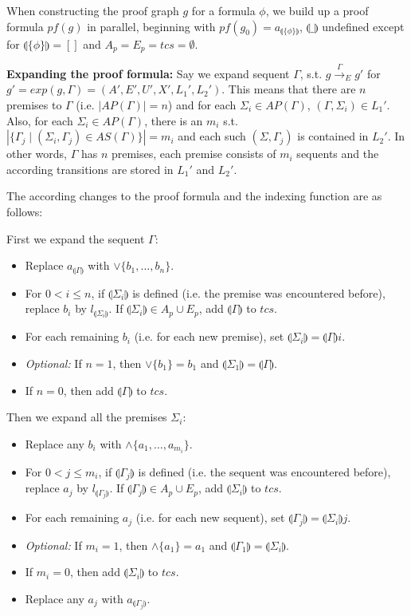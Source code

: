 \documentclass{llncs}
\newcommand{\ind}[1]{\llparenthesis #1 \rrparenthesis}
\begin{document}
When constructing the proof graph $g$ for a formula $\phi$, we build up a proof formula
$pf(g)$ in parallel, beginning with $pf(g_0)=a_{\ind{\{\phi\}}}$, $\ind{\_}$ undefined except
for $\ind{\{\phi\}}=[]$ and $A_p=E_p=tcs=\emptyset$.

\noindent\textbf{Expanding the proof formula:} 
Say we expand sequent $\Gamma$, s.t. $g\stackrel{\Gamma}\rightarrow_E g'$ for $g'=exp(g,\Gamma)=(A',E',U',X',L_1',L_2')$.
This means that there are $n$ premises to $\Gamma$ (i.e. $|AP(\Gamma)|=n$) and for each $\Sigma_i \in AP(\Gamma)$,
$(\Gamma,\Sigma_i)\in L_1'$. Also, for each $\Sigma_i \in AP(\Gamma)$, there is an $m_i$ s.t.
$|\{\Gamma_j\mid (\Sigma_i,\Gamma_j)\in AS(\Gamma)\}|=m_i$ and each such $(\Sigma,\Gamma_j)$ is contained in $L_2'$.
In other words, $\Gamma$ has $n$ premises, each premise consists of $m_i$ sequents and the according
transitions are stored in $L_1'$ and $L_2'$.

The according changes to the proof formula and the indexing function are as follows:

\noindent First we expand the sequent $\Gamma$:
\begin{itemize}
\item Replace $a_{\ind{\Gamma}}$ with $\vee\{b_1,\ldots,b_n\}$.
\item For $0<i\leq n$, if $\ind{\Sigma_i}$ is defined (i.e. the premise was encountered before),
replace $b_i$ by $l_{\ind{\Sigma_i}}$. If $\ind{\Sigma_i}\in A_p\cup E_p$, add $\ind{\Gamma}$ to $tcs$.
\item For each remaining $b_i$ (i.e. for each new premise), set $\ind{\Sigma_i}=\ind{\Gamma}i$.
\item \emph{Optional:} If $n=1$, then $\vee\{b_1\}=b_1$ and $\ind{\Sigma_1}=\ind{\Gamma}$.
\item If $n=0$, then add $\ind{\Gamma}$ to $tcs$.
\end{itemize}

\noindent Then we expand all the premises $\Sigma_i$:
\begin{itemize}
\item Replace any $b_i$ with $\wedge\{a_1,\ldots,a_{m_i}\}$.
\item For $0<j\leq m_i$, if $\ind{\Gamma_j}$ is defined (i.e. the sequent was encountered before), 
replace $a_j$ by $l_{\ind{\Gamma_j}}$. If $\ind{\Gamma_j}\in A_p\cup E_p$, add $\ind{\Sigma_i}$ to $tcs$.
\item For each remaining $a_j$ (i.e. for each new sequent), set $\ind{\Gamma_j}=\ind{\Sigma_i}j$.
\item \emph{Optional:} If $m_i=1$, then $\wedge\{a_1\}=a_1$ and $\ind{\Gamma_1}=\ind{\Sigma_i}$.
\item If $m_i=0$, then add $\ind{\Sigma_i}$ to $tcs$.
\item Replace any $a_j$ with $a_{\ind{\Gamma_j}}$.
\end{itemize}
\end{document}
